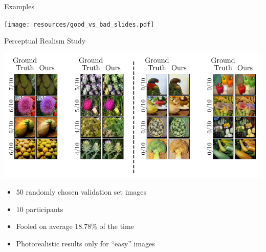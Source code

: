 \documentclass{beamer}
\begin{document}
\begin{frame}{Examples}
  \begin{center}
    \texttt{[image: resources/good\_vs\_bad\_slides.pdf]}
  \end{center}
\end{frame}

\begin{frame}{Perceptual Realism Study}
  \begin{center}
    \includegraphics[width=\textwidth]{resources/amt_results_slides.pdf}
  \end{center}

  \begin{itemize}
    \item $50$ randomly chosen validation set images
    \item $10$ participants
    \item Fooled on average $18.78\%$ of the time
    \item Photorealistic results only for ``easy'' images
  \end{itemize}
\end{frame}
\end{document}
